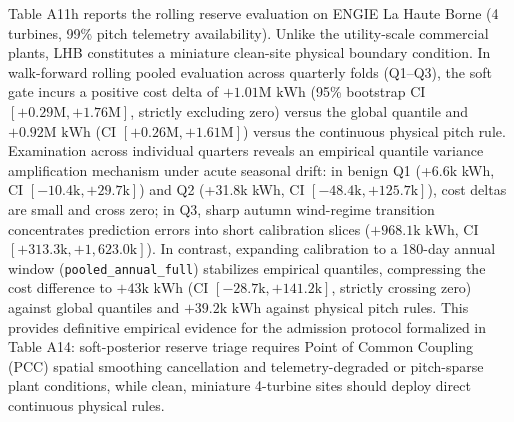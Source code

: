 \documentclass[
  journal]{IEEEtran}
\begin{document}
Table A11h reports the rolling reserve evaluation on ENGIE La Haute
Borne (4 turbines, 99\% pitch telemetry availability). Unlike the
utility-scale commercial plants, LHB constitutes a miniature clean-site
physical boundary condition. In walk-forward rolling pooled evaluation
across quarterly folds (Q1--Q3), the soft gate incurs a positive cost
delta of \(+1.01\text{M kWh}\) (95\% bootstrap CI
\([+0.29\text{M}, +1.76\text{M}]\), strictly excluding zero) versus the
global quantile and \(+0.92\text{M kWh}\) (CI
\([+0.26\text{M}, +1.61\text{M}]\)) versus the continuous physical pitch
rule. Examination across individual quarters reveals an empirical
quantile variance amplification mechanism under acute seasonal drift: in
benign Q1 (+6.6k kWh, CI \([-10.4\text{k}, +29.7\text{k}]\)) and Q2
(+31.8k kWh, CI \([-48.4\text{k}, +125.7\text{k}]\)), cost deltas are
small and cross zero; in Q3, sharp autumn wind-regime transition
concentrates prediction errors into short calibration slices
(\(+968.1\text{k kWh}\), CI \([+313.3\text{k}, +1,623.0\text{k}]\)). In
contrast, expanding calibration to a 180-day annual window
(\texttt{pooled\_annual\_full}) stabilizes empirical quantiles,
compressing the cost difference to \(+43\text{k kWh}\) (CI
\([-28.7\text{k}, +141.2\text{k}]\), strictly crossing zero) against
global quantiles and \(+39.2\text{k kWh}\) against physical pitch rules.
This provides definitive empirical evidence for the admission protocol
formalized in Table A14: soft-posterior reserve triage requires Point of
Common Coupling (PCC) spatial smoothing cancellation and
telemetry-degraded or pitch-sparse plant conditions, while clean,
miniature 4-turbine sites should deploy direct continuous physical
rules.
\end{document}
